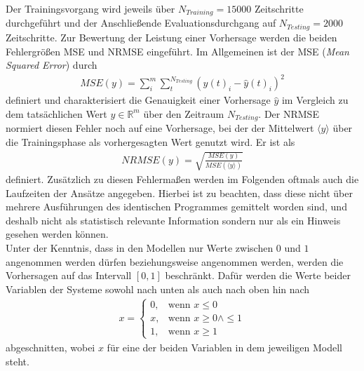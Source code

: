 Der Trainingsvorgang wird jeweils über $N_{Training}=15000$ Zeitschritte durchgeführt und der Anschließende Evaluationsdurchgang auf $N_{Testing} = 2000$ Zeitschritte.
Zur Bewertung der Leistung einer Vorhersage werden die beiden Fehlergrößen MSE und NRMSE eingeführt. Im Allgemeinen ist der MSE (\textit{Mean Squared Error}) durch
\begin{align}
MSE(y) = \sum_i^m \sum_t^{N_{Testing}} \left(y(t)_i - \hat{y}(t)_i \right)^2
\end{align}
definiert und charakterisiert die Genauigkeit einer Vorhersage $\hat{y}$ im Vergleich zu dem tatsächlichen Wert $y \in \mathbb{R}^m$ über den Zeitraum $N_{Testing}$. Der NRMSE normiert diesen Fehler noch auf eine Vorhersage, bei der der Mittelwert $\langle y \rangle$ über die Trainingsphase als vorhergesagten Wert genutzt wird. Er ist als
\begin{align}
NRMSE(y) = \sqrt{\frac{MSE(y)}{MSE\left(\langle y \rangle\right)}}
\end{align}
definiert. Zusätzlich zu diesen Fehlermaßen werden im Folgenden oftmals auch die Laufzeiten der Ansätze angegeben. Hierbei ist zu beachten, dass diese nicht über mehrere Ausführungen des identischen Programmes gemittelt worden sind, und deshalb nicht als statistisch relevante Information sondern nur als ein Hinweis gesehen werden können.\\

Unter der Kenntnis, dass in den Modellen nur Werte zwischen $0$ und $1$ angenommen werden dürfen beziehungsweise angenommen werden, werden die Vorhersagen auf das Intervall $[0, 1]$ beschränkt. Dafür werden die Werte beider Variablen der Systeme sowohl nach unten als auch nach oben hin nach 
\begin{align}
x = \begin{cases}
	0,& \text{wenn } x \leq 0\\
	x,& \text{wenn } x \geq 0 \land \leq 1\\
    1,& \text{wenn } x \geq 1
\end{cases}
\end{align}
abgeschnitten, wobei $x$ für eine der beiden Variablen in dem jeweiligen Modell steht.

\FloatBarrier
